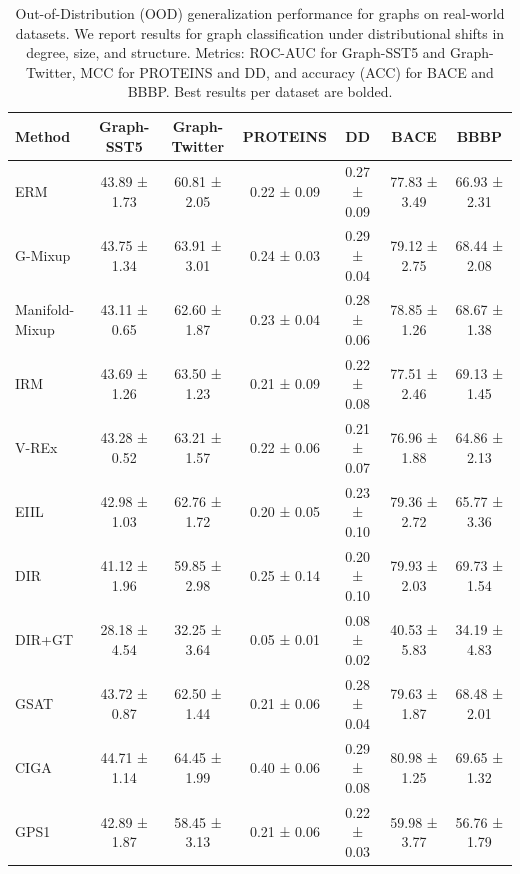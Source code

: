 \documentclass[a4paper,fleqn]{cas-dc}
\begin{document}
\begin{table}%
\caption{Out-of-Distribution (OOD) generalization performance for graphs on real-world datasets. 
We report results for graph classification under distributional shifts in degree, size, and structure. 
Metrics: ROC-AUC for Graph-SST5 and Graph-Twitter, MCC for PROTEINS and DD, and accuracy (ACC) for BACE and BBBP. 
Best results per dataset are bolded.}
\label{tbl4}
\begin{tabular*}{\tblwidth}{@{}LCCCCCC@{}}
\toprule
\textbf{Method} & \textbf{Graph-SST5} & \textbf{Graph-Twitter} & \textbf{PROTEINS} & \textbf{DD} & \textbf{BACE} & \textbf{BBBP} \\
\midrule
ERM\cite{donini2018empirical}          & 43.89 ± 1.73 & 60.81 ± 2.05 & 0.22 ± 0.09 & 0.27 ± 0.09 & 77.83 ± 3.49 & 66.93 ± 2.31 \\
G-Mixup\cite{han2022g}        & 43.75 ± 1.34 & 63.91 ± 3.01 & 0.24 ± 0.03 & 0.29 ± 0.04 & 79.12 ± 2.75 & 68.44 ± 2.08 \\
Manifold-Mixup\cite{verma2019manifold} & 43.11 ± 0.65 & 62.60 ± 1.87 & 0.23 ± 0.04 & 0.28 ± 0.06 & 78.85 ± 1.26 & 68.67 ± 1.38 \\
IRM\cite{DBLP:journals/corr/abs-1907-02893}            & 43.69 ± 1.26 & 63.50 ± 1.23 & 0.21 ± 0.09 & 0.22 ± 0.08 & 77.51 ± 2.46 & 69.13 ± 1.45 \\
V-REx\cite{krueger2021out}          & 43.28 ± 0.52 & 63.21 ± 1.57 & 0.22 ± 0.06 & 0.21 ± 0.07 & 76.96 ± 1.88 & 64.86 ± 2.13 \\
EIIL\cite{creager2021environment}           & 42.98 ± 1.03 & 62.76 ± 1.72 & 0.20 ± 0.05 & 0.23 ± 0.10 & 79.36 ± 2.72 & 65.77 ± 3.36 \\
DIR\cite{wu2022discovering}            & 41.12 ± 1.96 & 59.85 ± 2.98 & 0.25 ± 0.14 & 0.20 ± 0.10 & 79.93 ± 2.03 & 69.73 ± 1.54 \\
{\color{blue}DIR+GT}                               & 28.18 ± 4.54 & 32.25 ± 3.64 &  0.05 ± 0.01 & 0.08 ± 0.02 & 40.53 ± 5.83 & 34.19 ± 4.83 \\
GSAT\cite{miao2022interpretable}           & 43.72 ± 0.87 & 62.50 ± 1.44 & 0.21 ± 0.06 & 0.28 ± 0.04 & 79.63 ± 1.87 & 68.48 ± 2.01 \\
CIGA\cite{chen2023pareto}           & 44.71 ± 1.14 & 64.45 ± 1.99 & 0.40 ± 0.06 & 0.29 ± 0.08 & 80.98 ± 1.25 & 69.65 ± 1.32 \\
{\color{blue}GPS1\cite{rampavsek2022recipe} }                & 42.89 ± 1.87  & 58.45 ± 3.13  & 0.21 ± 0.06   & 0.22 ± 0.03 & 59.98 ± 3.77 & 56.76 ± 1.79 \\

\end{tabular*}
\end{table}
\end{document}
